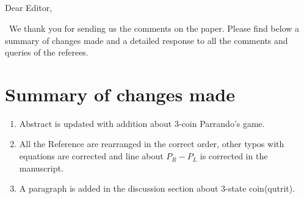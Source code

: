 \documentclass[12pt]{article}
\title{~~}
\begin{document}
\begin{flushleft}
Dear Editor,
\end{flushleft}

~We thank you for sending us the comments on the paper. Please find below a summary of changes made and a detailed response to all the comments and queries of the referees.
\section*{Summary of changes made}
\begin{enumerate}
\item Abstract is updated with addition about 3-coin Parrando's game.
\item All the Reference are rearranged in the correct order, other typos with equations are corrected and line about $P_R - P_L$ is corrected in the manuscript.
\item A paragraph is added in the discussion section about 3-state coin(qutrit).
\end{enumerate}
\end{document}
